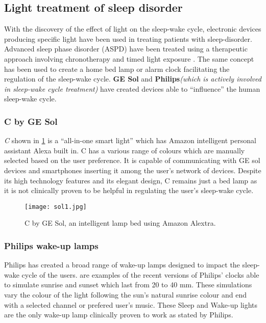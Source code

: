 \subsection{Light treatment of sleep disorder}
With the discovery of the effect of light on the sleep-wake cycle, electronic devices producing specific light have been used in treating patients with sleep-disorder. Advanced sleep phase disorder (ASPD) have been treated using a therapeutic approach involving chronotherapy and timed light exposure \cite{th2010}. The same concept has been used to create a home bed lamp or alarm clock facilitating the regulation of the sleep-wake cycle. \textbf{GE Sol} and \textbf{Philips}\textit{(which is actively involved in sleep-wake cycle treatment)} have created devices able to ``influence'' the human sleep-wake cycle.

\subsubsection{C by GE Sol}
\textit{C} shown in \cref{fig:c} is a ``all-in-one smart light'' \cite{gesol} which has Amazon intelligent personal assistant Alexa built in. C has a various range of colours which are manually selected based on the user preference. It is capable of communicating with GE sol devices and smartphones inserting it among the user's network of devices. Despite its high technology features and its elegant design, C remains just a bed lamp as it is not clinically proven to be helpful in regulating the user's sleep-wake cycle.
\begin{figure}[h!]
\centering
\texttt{[image: sol1.jpg]}
\caption{C by GE Sol, an intelligent lamp bed using Amazon Alextra.}
\label{fig:c}
\end{figure}

\subsubsection{Philips wake-up lamps}
Philips has created a broad range of wake-up lamps designed to impact the sleep-wake cycle of the users.  are examples of the recent versions of Philips' clocks able to simulate sunrise and sunset which last from 20 to 40 mm. These simulations vary the colour of the light following the sun's natural sunrise colour and end with a selected channel or prefered user's music. These Sleep and Wake-up lights are the only wake-up lamp clinically proven to work as stated by Philips\cite{philips}. 

